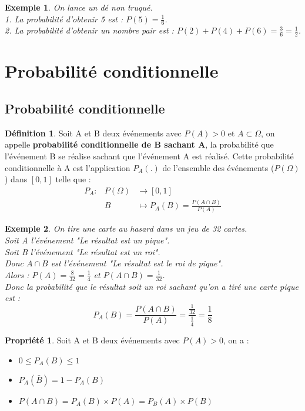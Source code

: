 \documentclass[a4paper,12pt]{article}
\newtheorem{Ex}{Exemple}[section]
\theoremstyle{theorem}
\theoremstyle{definition}
\newtheorem{Propriete}{Propriété}[section]
\theoremstyle{definition}
\theoremstyle{definition}
\newtheorem{Def}{Définition}[section]
\begin{document}
		\begin{Ex}
			On lance un dé non truqué. \\
			1. La probabilité d'obtenir 5 est : $P(5) = \frac{1}{6}$. \\
			2. La probabilité d'obtenir un nombre pair est : $P(2)+P(4)+P(6) = \frac{3}{6} = \frac{1}{2}$.
		\end{Ex}
	
\section{Probabilité conditionnelle}
	\subsection{Probabilité conditionnelle}
	
		\begin{Def}
			Soit A et B deux événements avec $P(A) > 0$ et $A\subset \Omega$, on appelle \textbf{probabilité conditionnelle de B sachant A}, la probabilité que l'événement B se réalise sachant que l'événement A est réalisé. Cette probabilité conditionnelle à A est l'application $P_{A}(.)$ de l'ensemble des événements ($P(\Omega)$) dans $[0,1]$ telle que :
			\[ \begin{array}{lll}
					P_{A} : &P(\Omega) &\rightarrow [0,1] \\
					&B &\mapsto P_{A}(B) = \frac{P(A\cap B)}{P(A)}
				\end{array}
			       \]
		\end{Def}
	
		\begin{Ex}
			On tire une carte au hasard dans un jeu de 32 cartes. \\
			Soit A l'événement "Le résultat est un pique". \\
			Soit B l'événement "Le résultat est un roi". \\
			Donc $A\cap B$ est l'événement "Le résultat est le roi de pique". \\
			Alors : $P(A) = \frac{8}{32} = \frac{1}{4}$ et $P(A\cap B) = \frac{1}{32}$. \\
			Donc la probabilité que le résultat soit un roi sachant qu'on a tiré une carte pique est : 
			\[P_{A}(B) = \frac{P(A\cap B)}{P(A)} = \frac{\frac{1}{32}}{\frac{1}{4}} = \frac{1}{8}\]
		\end{Ex}
	
		\begin{Propriete}
			Soit A et B deux événements avec $P(A)>0$, on a : \\
			\begin{itemize}
				\item $0 \leq P_{A}(B) \leq 1$
				\item $P_{A}(\bar{B}) = 1-P_{A}(B)$
				\item $P(A\cap B) = P_{A}(B) \times P(A) = P_{B}(A) \times P(B)$
			\end{itemize}
		\end{Propriete}
	
\end{document}
